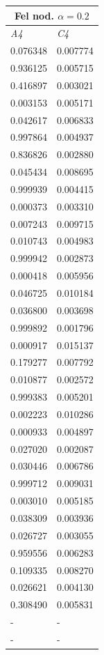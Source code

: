\documentclass[a4paper,10pt]{article}
\begin{document}
\begin{centering}
{%


\begin{tabular}{| l | l| }
\hline
\multicolumn{2}{|c|}{Fel nod. $\alpha=0.2$ }\\ \hline
\emph{A4} & \emph{C4} \\ \hline
0.076348 & 0.007774 \\ \hline
0.936125 & 0.005715 \\ \hline
0.416897 & 0.003021 \\ \hline
0.003153 & 0.005171 \\ \hline
0.042617 & 0.006833 \\ \hline
0.997864 & 0.004937 \\ \hline
0.836826 & 0.002880 \\ \hline
0.045434 & 0.008695 \\ \hline
0.999939 & 0.004415 \\ \hline
0.000373 & 0.003310 \\ \hline
0.007243 & 0.009715 \\ \hline
0.010743 & 0.004983 \\ \hline
0.999942 & 0.002873 \\ \hline
0.000418 & 0.005956 \\ \hline
0.046725 & 0.010184 \\ \hline
0.036800 & 0.003698 \\ \hline
0.999892 & 0.001796 \\ \hline
0.000917 & 0.015137 \\ \hline
0.179277 & 0.007792 \\ \hline
0.010877 & 0.002572 \\ \hline
0.999383 & 0.005201 \\ \hline
0.002223 & 0.010286 \\ \hline
0.000933 & 0.004897 \\ \hline
0.027020 & 0.002087 \\ \hline
0.030446 & 0.006786 \\ \hline
0.999712 & 0.009031 \\ \hline
0.003010 & 0.005185 \\ \hline
0.038309 & 0.003936 \\ \hline
0.026727 & 0.003055 \\ \hline
0.959556 & 0.006283 \\ \hline
0.109335 & 0.008270 \\ \hline
0.026621 & 0.004130 \\ \hline\hline
0.308490 & 0.005831  \\ \hline
- & - \\ \hline
- & - \\ \hline
\end{tabular}
}


\end{centering}
\end{document}
